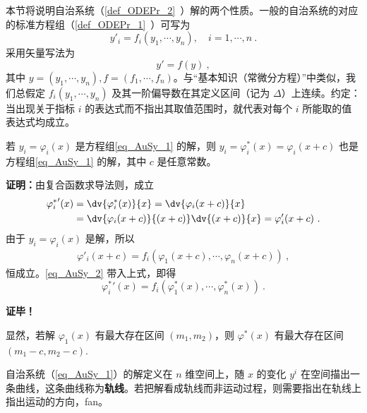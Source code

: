 
本节将说明自治系统（\autoref{def_ODEPr_2}~）解的两个性质。一般的自治系统的对应的标准方程组（\autoref{def_ODEPr_1}~）可写为
\begin{equation}\label{eq_AuSy_1}
y'_i=f_i(y_1,\cdots,y_n),\quad i=1,\cdots,n~.
\end{equation}
采用矢量写法为
\begin{equation}
y'=f(y)~,
\end{equation}
其中 $y=(y_1,\cdots,y_n),f=(f_1,\cdots,f_n)$。与“基本知识（常微分方程）”中类似，我们总假定 $f_i(y_1,\cdots,y_n)$ 及其一阶偏导数在其定义区间（记为 $\Delta$）上连续。约定：当出现关于指标 $i$ 的表达式而不指出其取值范围时，就代表对每个 $i$ 所能取的值表达式均成立。

\begin{theorem}{}
若 $y_i=\varphi_i(x)$ 是方程组\autoref{eq_AuSy_1} 的解，则 $y_i=\varphi^*_i(x)=\varphi_i(x+c)$ 也是方程组\autoref{eq_AuSy_1} 的解，其中 $c$ 是任意常数。
\end{theorem}
\textbf{证明：}由复合函数求导法则，成立
\begin{equation}\label{eq_AuSy_2}
\begin{aligned}
{\varphi^*_i}'(x)&=\dv{\varphi^*_i(x)}{x}=\dv{\varphi_i(x+c)}{x}\\
&=\dv{\varphi_i(x+c)}{(x+c)}\dv{(x+c)}{x}=\varphi'_i(x+c)~.
\end{aligned}
\end{equation}
由于 $y_i=\varphi_i(x)$ 是解，所以
\begin{equation}
\begin{aligned}
\varphi'_i(x+c)=f_i(\varphi_1(x+c),\cdots,\varphi_n(x+c))~,
\end{aligned}
\end{equation}
恒成立。\autoref{eq_AuSy_2} 带入上式，即得
\begin{equation}
{\varphi^*_i}'(x)=f_i(\varphi^*_1(x),\cdots,\varphi^*_n(x))~.
\end{equation}

\textbf{证毕！}

显然，若解 $\varphi_1(x)$ 有最大存在区间 $(m_1,m_2)$，则 $\varphi^*(x)$ 有最大存在区间 $(m_1-c,m_2-c)$.

自治系统（\autoref{eq_AuSy_1}）的解定义在 $n$ 维空间上，随 $x$ 的变化 $y^i$ 在空间描出一条曲线，这条曲线称为\textbf{轨线}。若把解看成轨线而非运动过程，则需要指出在轨线上指出运动的方向，fan。